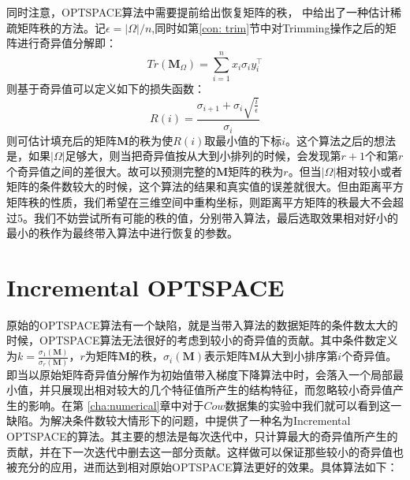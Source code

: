 同时注意，OPTSPACE算法中需要提前给出恢复矩阵的秩，
\cite{keshavan2009gradient}中给出了一种估计稀疏矩阵秩的方法。记$\epsilon = |\Omega|/n$,同时如第\ref{con: trim}节中对Trimming操作之后的矩阵进行奇异值分解即：
\begin{equation*}
    Tr(\mathbf{M}_{\Omega}) = \sum_{i=1}^n x_i\sigma_iy_i^\intercal
\end{equation*}
则基于奇异值可以定义如下的损失函数：
\begin{equation*}
    R(i) = \frac{\sigma_{i+1} + \sigma_i\sqrt{\frac{i}{\epsilon}}}{\sigma_i}
\end{equation*}
则可估计填充后的矩阵$\mathbf{M}$的秩为使$R(i)$取最小值的下标$i$。这个算法之后的想法是，如果$|\Omega|$足够大，则当把奇异值按从大到小排列的时候，会发现第$r+1$个和第$r$个奇异值之间的差很大。故可以预测完整的$\mathbf{M}$矩阵的秩为$r$。但当$|\Omega|$相对较小或者矩阵的条件数较大的时候，这个算法的结果和真实值的误差就很大。但由距离平方矩阵秩的性质，我们希望在三维空间中重构坐标，则距离平方矩阵的秩最大不会超过5。我们不妨尝试所有可能的秩的值，分别带入算法，最后选取效果相对好小的最小的秩作为最终带入算法中进行恢复的参数。

\section{Incremental OPTSPACE}
原始的OPTSPACE算法有一个缺陷，就是当带入算法的数据矩阵的条件数太大的时候，OPTSPACE算法无法很好的考虑到较小的奇异值的贡献。其中条件数定义为$k = \frac{\sigma_1(\mathbf{M})}{\sigma_r(\mathbf{M})}$，$r$为矩阵$\mathbf{M}$的秩，$\sigma_i(\mathbf{M})$表示矩阵$\mathbf{M}$从大到小排序第$i$个奇异值。即当以原始矩阵奇异值分解作为初始值带入梯度下降算法中时，会落入一个局部最小值，并只展现出相对较大的几个特征值所产生的结构特征，而忽略较小奇异值产生的影响。在第
\ref{cha:numerical}章中对于$Cow$数据集的实验中我们就可以看到这一缺陷。为解决条件数较大情形下的问题，\cite{keshavan2009gradient}中提供了一种名为Incremental OPTSPACE的算法。其主要的想法是每次迭代中，只计算最大的奇异值所产生的贡献，并在下一次迭代中删去这一部分贡献。这样做可以保证那些较小的奇异值也被充分的应用，进而达到相对原始OPTSPACE算法更好的效果。具体算法如下：

